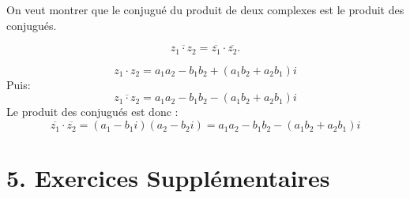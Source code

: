 \begin{solution}
    \text{ }

On veut montrer que le conjugué du produit de deux complexes est le produit des conjugués.

\[
\overline{z_1 \cdot z_2} = \overline{z_1} \cdot \overline{z_2}.
\]

\[
z_1 \cdot z_2 = a_1a_2 - b_1b_2 + (a_1b_2 + a_2b_1)i
\]
Puis: 
\[
\overline{z_1 \cdot z_2} = a_1a_2 - b_1b_2 - (a_1b_2 + a_2b_1)i
\]
Le produit des conjugués est donc :
\[
\overline{z_1} \cdot \overline{z_2} = (a_1 - b_1i)(a_2 - b_2i) = a_1a_2 - b_1b_2 - (a_1b_2 + a_2b_1)i
\]
\end{solution}

\newpage

\section*{5. Exercices Supplémentaires}
